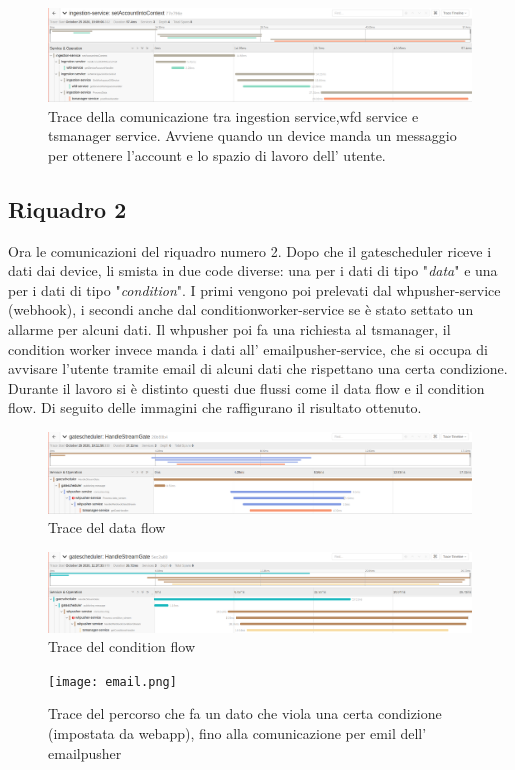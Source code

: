\documentclass[a4paper,12pt,titlepage,italian,openany]{report}
\begin{document}
\begin{figure}[H]
    \includegraphics[scale=0.21]{75.png}
    \centering
    \caption{Trace della comunicazione tra ingestion service,wfd service e tsmanager service. Avviene quando un device manda un messaggio per ottenere l'account e lo spazio di lavoro dell' utente.}
\end{figure}
\subsection{Riquadro 2}
Ora le comunicazioni del riquadro numero 2. Dopo che il gatescheduler riceve i dati dai device, li smista in due code diverse: una per i dati di tipo "\textit{data}" e una per i dati di tipo "\textit{condition}". I primi vengono poi prelevati dal whpusher-service (webhook), i secondi anche dal conditionworker-service se è stato settato un  allarme per alcuni dati. Il whpusher poi fa una richiesta al tsmanager, il condition worker invece manda i dati all' emailpusher-service, che si occupa di avvisare l'utente tramite email di alcuni dati che rispettano una certa condizione.
\\Durante il lavoro si è distinto questi due flussi come il data flow e il condition flow. Di seguito delle immagini che raffigurano il risultato ottenuto.

\begin{figure}[H]
    \includegraphics[scale=0.21]{76.png}
    \centering
    \caption{Trace del data flow}
\end{figure}
\begin{figure}[H]
    \includegraphics[scale=0.21]{77.png}
    \centering
    \caption{Trace del condition flow}
\end{figure}
\begin{figure}[H]
    \texttt{[image: email.png]}
    \centering
    \caption{Trace del percorso che fa un dato che viola una certa condizione (impostata da webapp), fino alla comunicazione per emil dell' emailpusher}
\end{figure}
\end{document}
